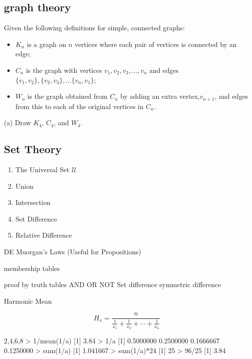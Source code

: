 \documentclass[]{report}
\begin{document}
\begin{enumerate}
\chapter{graph theory }
Given the following definitions for simple, connected graphs:
\begin{itemize}
\item $K_n$ is a graph on $n$ vertices where each pair of vertices is connected by an edge;
\item $C_n$ is the graph with vertices $v_1, v_2, v_3, \dots, v_n$ and edges $\{v_1,v_2\}, \{v_2,v_3\}, \dots\{v_n, v_1\}$;
\item $W_n$ is the graph obtained from $C_n$ by adding an extra vertex,$v_{n+1}$, and edges
from this to each of the original vertices in $C_n$.
\end{itemize}
(a) Draw $K_4$, $C_4$, and $W_4$. 


\section{Set Theory}
\begin{enumerate}
\item The Universal Set $\mathcal{U}$
\item Union
\item Intersection
\item Set Difference
\item Relative Difference
\end{enumerate}



DE Muorgan's Laws (Useful for Propositions)

membership tables

proof by truth tables
AND
OR
NOT
Set difference
symmetric difference



\newpage


Harmonic Mean

\[ H_x = \frac{ n }{ \frac{ 1 }{ x_1 } + \frac{ 1 }{ x_2 } + \cdots + \frac{ 1 }{ x_n } } \]

2,4,6,8
> 1/mean(1/a)
[1] 3.84
> 1/a
[1] 0.5000000 0.2500000 0.1666667 0.1250000
> sum(1/a)
[1] 1.041667
> sum(1/a)*24
[1] 25
> 96/25
[1] 3.84




\end{enumerate}
\end{document}
